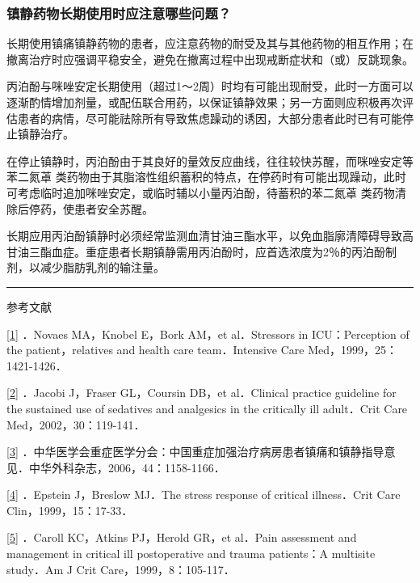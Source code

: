 \subsubsection{镇静药物长期使用时应注意哪些问题？}

长期使用镇痛镇静药物的患者，应注意药物的耐受及其与其他药物的相互作用；在撤离治疗时应强调平稳安全，避免在撤离过程中出现戒断症状和（或）反跳现象。

丙泊酚与咪唑安定长期使用（超过1～2周）时均有可能出现耐受，此时一方面可以逐渐酌情增加剂量，或配伍联合用药，以保证镇静效果；另一方面则应积极再次评估患者的病情，尽可能祛除所有导致焦虑躁动的诱因，大部分患者此时已有可能停止镇静治疗。

在停止镇静时，丙泊酚由于其良好的量效反应曲线，往往较快苏醒，而咪唑安定等苯二氮䓬
类药物由于其脂溶性组织蓄积的特点，在停药时有可能出现躁动，此时可考虑临时追加咪唑安定，或临时辅以小量丙泊酚，待蓄积的苯二氮䓬
类药物清除后停药，使患者安全苏醒。

长期应用丙泊酚镇静时必须经常监测血清甘油三酯水平，以免血脂廓清障碍导致高甘油三酯血症。重症患者长期镇静需用丙泊酚时，应首选浓度为2％的丙泊酚制剂，以减少脂肪乳剂的输注量。

\begin{center}\rule{0.5\linewidth}{\linethickness}\end{center}

参考文献

\protect\hyperlink{text00027.htmlux5cux23ch1-26-back}{{[}1{]}} ．Novaes
MA，Knobel E，Bork AM，et al．Stressors in ICU：Perception of the
patient，relatives and health care team．Intensive Care
Med，1999，25：1421-1426．

\protect\hyperlink{text00027.htmlux5cux23ch2-26-back}{{[}2{]}} ．Jacobi
J，Fraser GL，Coursin DB，et al．Clinical practice guideline for the
sustained use of sedatives and analgesics in the critically ill
adult．Crit Care Med，2002，30：119-141．

\protect\hyperlink{text00027.htmlux5cux23ch3-26-back}{{[}3{]}}
．中华医学会重症医学分会：中国重症加强治疗病房患者镇痛和镇静指导意见．中华外科杂志，2006，44：1158-1166．

\protect\hyperlink{text00027.htmlux5cux23ch4-26-back}{{[}4{]}} ．Epstein
J，Breslow MJ．The stress response of critical illness．Crit Care
Clin，1999，15：17-33．

\protect\hyperlink{text00027.htmlux5cux23ch5-26-back}{{[}5{]}} ．Caroll
KC，Atkins PJ，Herold GR，et al．Pain assessment and management in
critical ill postoperative and trauma patients：A multisite study．Am J
Crit Care，1999，8：105-117．

